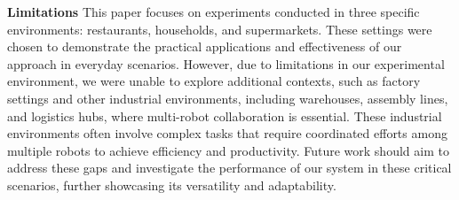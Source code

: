 \clearpage
\textbf{Limitations}
\label{sec:limitations}
This paper focuses on experiments conducted in three specific environments: restaurants, households, and supermarkets. These settings were chosen to demonstrate the practical applications and effectiveness of our approach in everyday scenarios. However, due to limitations in our experimental environment, we were unable to explore additional contexts, such as factory settings and other industrial environments, including warehouses, assembly lines, and logistics hubs, where multi-robot collaboration is essential. These industrial environments often involve complex tasks that require coordinated efforts among multiple robots to achieve efficiency and productivity. Future work should aim to address these gaps and investigate the performance of our system in these critical scenarios, further showcasing its versatility and adaptability.